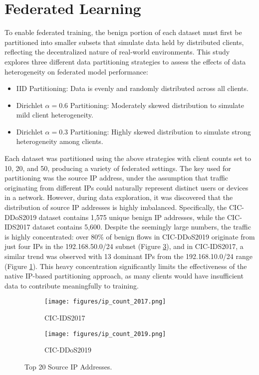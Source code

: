 \section{Federated Learning}

To enable federated training, the benign portion of each dataset must first be partitioned into smaller subsets that simulate data held by distributed clients, reflecting the decentralized nature of real-world environments. This study explores three different data partitioning strategies to assess the effects of data heterogeneity on federated model performance:

\begin{itemize}
    \item IID Partitioning: Data is evenly and randomly distributed across all clients.
    \item Dirichlet $\alpha=0.6$ Partitioning: Moderately skewed distribution to simulate mild client heterogeneity.
    \item Dirichlet $\alpha=0.3$ Partitioning: Highly skewed distribution to simulate strong heterogeneity among clients.
\end{itemize}

Each dataset was partitioned using the above strategies with client counts set to 10, 20, and 50, producing a variety of federated settings. The key used for partitioning was the source IP address, under the assumption that traffic originating from different IPs could naturally represent distinct users or devices in a network. However, during data exploration, it was discovered that the distribution of source IP addresses is highly imbalanced. Specifically, the CIC-DDoS2019 dataset contains 1,575 unique benign IP addresses, while the CIC-IDS2017 dataset contains 5,600. Despite the seemingly large numbers, the traffic is highly concentrated: over 80\% of benign flows in CIC-DDoS2019 originate from just four IPs in the 192.168.50.0/24 subnet (Figure \ref{fig:src_ip_count_2019}), and in CIC-IDS2017, a similar trend was observed with 13 dominant IPs from the 192.168.10.0/24 range (Figure \ref{fig:src_ip_count_2017}). This heavy concentration significantly limits the effectiveness of the native IP-based partitioning approach, as many clients would have insufficient data to contribute meaningfully to training. 

\begin{figure}[h]
    \centering

    \begin{subfigure}[b]{0.49\textwidth}
        \centering
        \texttt{[image: figures/ip\_count\_2017.png]}
        \caption{CIC-IDS2017}
        \label{fig:src_ip_count_2017}
    \end{subfigure}
    \hfill
    \begin{subfigure}[b]{0.49\textwidth}
        \centering
        \texttt{[image: figures/ip\_count\_2019.png]}
        \caption{CIC-DDoS2019}
        \label{fig:src_ip_count_2019}
    \end{subfigure}

    \caption{Top 20 Source IP Addresses.}
\end{figure}

